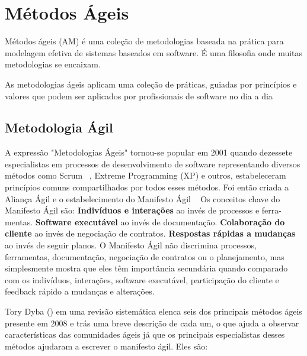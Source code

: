 \chapter{Métodos Ágeis}
\label{cap-metodos-ageis}

Métodos ágeis (AM) é uma coleção de metodologias baseada na prática para 
modelagem efetiva de sistemas baseados em software. É uma filosofia onde muitas metodologias se encaixam.

%
As metodologias ágeis aplicam uma coleção de práticas, guiadas por princípios e valores que podem ser aplicados por profissionais de software no dia a dia~\cite{}%

\section{Metodologia Ágil}
\label{metodologia-agil}

A expressão "Metodologias Ágeis" tornou-se popular em 2001 quando dezessete especialistas em processos de desenvolvimento de software representando diversos métodos como Scrum ~\cite{schwaber2002},
Extreme Programming (XP) e outros, estabeleceram princípios comuns compartilhados por todos esses métodos. Foi então criada a Aliança Ágil e o estabelecimento do Manifesto Ágil ~\cite{manifesto2013}
Os conceitos chave do Manifesto Ágil são:
\textbf{Indivíduos e interações} ao invés de processos e ferra-
mentas.
\textbf{Software executável} ao invés de documentação.
\textbf{Colaboração do cliente} ao invés de negociação de contratos.
\textbf{Respostas rápidas a mudanças} ao invés de seguir planos.
O Manifesto Ágil não discrimina processos, ferramentas, documentação, negociação de contratos ou o planejamento, mas simplesmente mostra que eles têm importância secundária quando comparado com os indivíduos, interações, software executável, participação do cliente e feedback rápido a mudanças e alterações.

%
Tory Dyba (\citeyear{dyba2008}) em uma revisão sistemática elenca seis dos principais métodos ágeis presente em 2008 e trás uma breve descrição de cada um, o que ajuda a observar características das comunidades ágeis já que os principais especialistas desses métodos ajudaram a escrever o manifesto ágil. Eles são:

